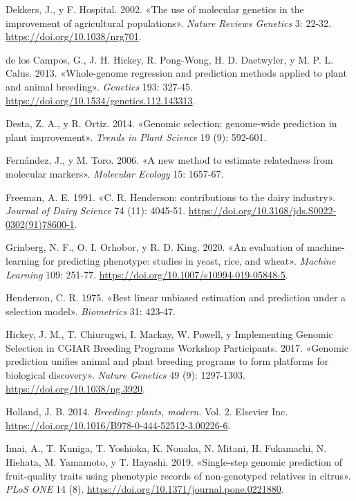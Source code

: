 \documentclass[11pt,spanish,a4paper,oneside,]{book} %
\begin{document}
\leavevmode\hypertarget{ref-cite:59}{}%
Dekkers, J., y F. Hospital. 2002. «The use of molecular genetics in the improvement of agricultural populations». \emph{Nature Reviews Genetics} 3: 22-32. \url{https://doi.org/10.1038/nrg701}.

\leavevmode\hypertarget{ref-cite:31}{}%
de los Campos, G., J. H. Hickey, R. Pong-Wong, H. D. Daetwyler, y M. P. L. Calus. 2013. «Whole-genome regression and prediction methods applied to plant and animal breeding». \emph{Genetics} 193: 327-45. \url{https://doi.org/10.1534/genetics.112.143313}.

\leavevmode\hypertarget{ref-cite:10}{}%
Desta, Z. A., y R. Ortiz. 2014. «Genomic selection: genome-wide prediction in plant improvement». \emph{Trends in Plant Science} 19 (9): 592-601.

\leavevmode\hypertarget{ref-cite:24}{}%
Fernández, J., y M. Toro. 2006. «A new method to estimate relatedness from molecular markers». \emph{Molecular Ecology} 15: 1657-67.

\leavevmode\hypertarget{ref-cite:28}{}%
Freeman, A. E. 1991. «C. R. Henderson: contributions to the dairy industry». \emph{Journal of Dairy Science} 74 (11): 4045-51. \url{https://doi.org/10.3168/jds.S0022-0302(91)78600-1}.

\leavevmode\hypertarget{ref-cite:35}{}%
Grinberg, N. F., O. I. Orhobor, y R. D. King. 2020. «An evaluation of machine-learning for predicting phenotype: studies in yeast, rice, and wheat». \emph{Machine Learning} 109: 251-77. \url{https://doi.org/10.1007/s10994-019-05848-5}.

\leavevmode\hypertarget{ref-cite:41}{}%
Henderson, C. R. 1975. «Best linear unbiased estimation and prediction under a selection model». \emph{Biometrics} 31: 423-47.

\leavevmode\hypertarget{ref-cite:44}{}%
Hickey, J. M., T. Chiurugwi, I. Mackay, W. Powell, y Implementing Genomic Selection in CGIAR Breeding Programs Workshop Participants. 2017. «Genomic prediction unifies animal and plant breeding programs to form platforms for biological discovery». \emph{Nature Genetics} 49 (9): 1297-1303. \url{https://doi.org/10.1038/ng.3920}.

\leavevmode\hypertarget{ref-cite:43}{}%
Holland, J. B. 2014. \emph{Breeding: plants, modern}. Vol. 2. Elsevier Inc. \url{https://doi.org/10.1016/B978-0-444-52512-3.00226-6}.

\leavevmode\hypertarget{ref-cite:20}{}%
Imai, A., T. Kuniga, T. Yoshioka, K. Nonaka, N. Mitani, H. Fukamachi, N. Hiehata, M. Yamamoto, y T. Hayashi. 2019. «Single-step genomic prediction of fruit-quality traits using phenotypic records of non-genotyped relatives in citrus». \emph{PLoS ONE} 14 (8). \url{https://doi.org/10.1371/journal.pone.0221880}.
\end{document}
